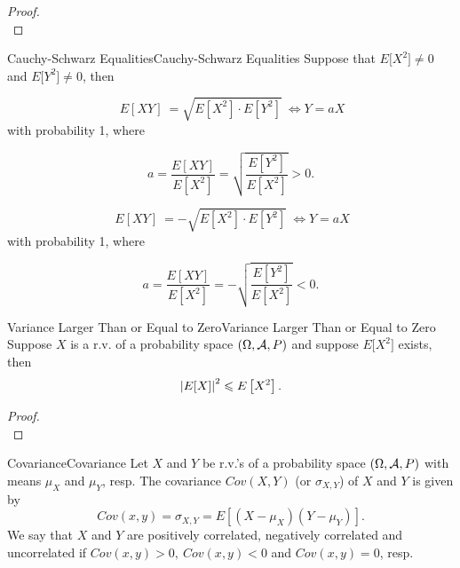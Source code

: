 \documentclass{elegantbook}
\begin{document}
\begin{proof}
\\[4cm]\vspace{0.01cm}
\end{proof}

\begin{remark}{Cauchy-Schwarz Equalities}{Cauchy-Schwarz Equalities}
Suppose that \(E\lbrack X^{2}\rbrack \neq 0\) and \(E\lbrack Y^{2}\rbrack \neq 0\), then

\[\left. \ E[XY] \right.\  = \sqrt{E\left\lbrack X^{2} \right\rbrack \cdot E\left\lbrack Y^{2} \right\rbrack}\  \Leftrightarrow Y = aX\]
with probability 1, where

\[a = \frac{E[XY]}{E\left\lbrack X^{2} \right\rbrack} = \sqrt{\frac{E\left\lbrack Y^{2} \right\rbrack}{E\left\lbrack X^{2} \right\rbrack}} > 0.\]

\[\left. \ E[XY] \right.\  = - \sqrt{E\left\lbrack X^{2} \right\rbrack \cdot E\left\lbrack Y^{2} \right\rbrack}\  \Leftrightarrow Y = aX\]
with probability 1, where

\[a = \frac{E[XY]}{E\left\lbrack X^{2} \right\rbrack} = - \sqrt{\frac{E\left\lbrack Y^{2} \right\rbrack}{E\left\lbrack X^{2} \right\rbrack}} < 0.\]

\end{remark}

\begin{corollary}{Variance Larger Than or Equal to Zero}{Variance Larger Than or Equal to Zero}
Suppose \(X\) is a r.v. of a probability space $(\Omega,\mathcal{A}, P)$ and suppose
\(E\lbrack X^{2}\rbrack\) exists, then
\[\left| E[X] \right|^{2} \leqslant E\left\lbrack X^{2} \right\rbrack.\]
\end{corollary}

\begin{proof}
\\[4cm]\vspace{0.01cm}
\end{proof}

\begin{definition}{Covariance}{Covariance}
Let \(X\) and \(Y\) be r.v.'s of a probability space $(\Omega,\mathcal{A}, P)$ with means \(\mu_{X}\) and \(\mu_{Y}\), resp. The covariance \(Cov(X,Y)\) (or \(\sigma_{X,Y}\)) of \(X\) and \(Y\) is given by
\[Cov(x,y) = \sigma_{X,Y} = E\left\lbrack \left( X - \mu_{X} \right)\left( Y - \mu_{Y} \right) \right\rbrack.\]
We say that \(X\) and \(Y\) are positively correlated, negatively correlated and uncorrelated if
\(Cov(x,y) > 0,\ Cov(x,y) < 0\) and
\(Cov(x,y) = 0\), resp.
\end{definition}
\end{document}
